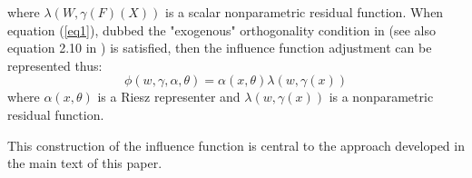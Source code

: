 where $\lambda(W, \gamma(F)(X))$ is a scalar nonparametric residual function. When equation (\ref{eq1}), dubbed the "exogenous" orthogonality condition in \citet{ichimura2022influence} (see also equation 2.10 in \citet{chernozhukov2022locally}) is satisfied, then the influence function adjustment can be represented thus:
\begin{equation}
\phi(w, \gamma, \alpha, \theta)=\alpha(x, \theta) \lambda(w, \gamma(x))   
\end{equation}
where $\alpha(x, \theta)$ is a Riesz representer and $\lambda(w, \gamma(x))$ is a nonparametric residual function.

This construction of the influence function is central to the approach developed in the main text of this paper.

\printbibliography




